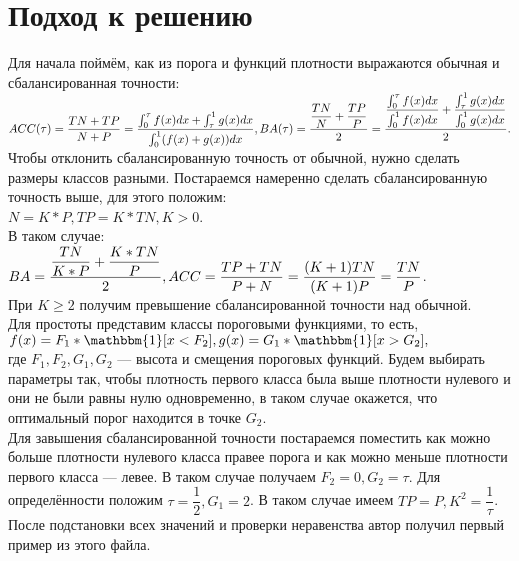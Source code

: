 \documentclass{article}
\begin{document}
\section{Подход к решению}
Для начала поймём, как из порога и функций плотности выражаются обычная и сбалансированная точности:\\
$ACC(\tau) = \dfrac{TN + TP}{N + P} = \dfrac{\int_{0}^{\tau}f(x)dx + \int_{\tau}^{1}g(x)dx}{\int_{0}^{1}(f(x) + g(x))dx},\\
\\
BA(\tau) = \dfrac{\dfrac{TN}{N} + \dfrac{TP}{P}}{2} = \dfrac{\dfrac{\int_{0}^{\tau}f(x)dx}{\int_{0}^{1}f(x)dx} + \dfrac{\int_{\tau}^{1}g(x)dx}{\int_{0}^{1}g(x)dx}}{2}.$\\
Чтобы отклонить сбалансированную точность от обычной, нужно сделать размеры классов разными. Постараемся намеренно сделать сбалансированную точность выше, для этого положим:\\
$N = K * P, TP = K * TN, K > 0$.\\
В таком случае:\\
$BA = \dfrac{\dfrac{TN}{K * P} + \dfrac{K * TN}{P}}{2},\\
ACC = \dfrac{TP + TN}{P + N} = \dfrac{(K + 1) TN}{(K + 1) P} = \dfrac{TN}{P}$.\\
При $K \ge 2$ получим превышение сбалансированной точности над обычной.\\
Для простоты представим классы пороговыми функциями, то есть,\\
$f(x) = F_1 * \mathbbm{1}[x < F_2],\\
g(x) = G_1 * \mathbbm{1}[x > G_2],$\\
где $F_1, F_2, G_1, G_2$ --- высота и смещения пороговых функций. Будем выбирать параметры так, чтобы плотность первого класса была выше плотности нулевого и они не были равны нулю одновременно, в таком случае окажется, что оптимальный порог находится в точке $G_2$.\\
Для завышения сбалансированной точности постараемся поместить как можно больше плотности нулевого класса правее порога и как можно меньше плотности первого класса --- левее. В таком случае получаем $F_2 = 0, G_2 = \tau$. Для определённости положим $\tau = \dfrac{1}{2}, G_1 = 2$. В таком случае имеем $TP = P, K^2 = \dfrac{1}{\tau}$. После подстановки всех значений и проверки неравенства автор получил первый пример из этого файла.
\end{document}
